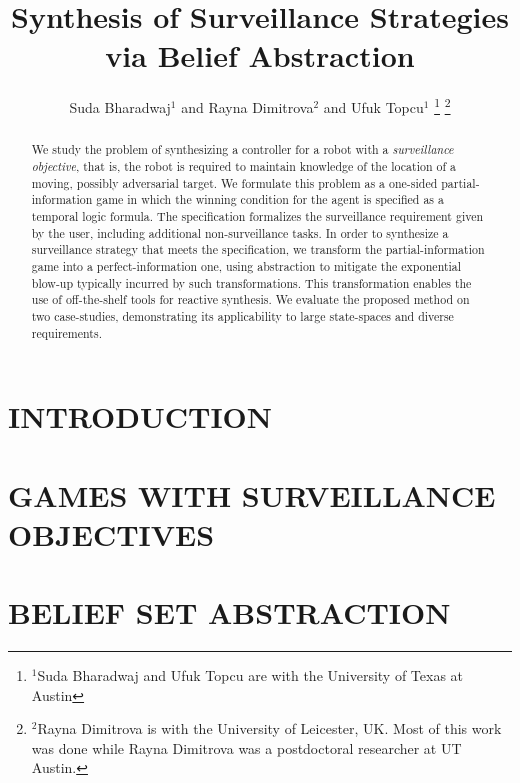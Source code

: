 \documentclass[letterpaper, 10 pt, conference]{ieeeconf}  %
\title{\LARGE \bf Synthesis of Surveillance Strategies via Belief Abstraction}
\author{Suda Bharadwaj$^{1}$ and Rayna Dimitrova$^{2}$ and Ufuk Topcu$^{1}$%
\thanks{$^{1}$Suda Bharadwaj and Ufuk Topcu are with the University of Texas at Austin}%
\thanks{$^{2}$Rayna Dimitrova is with the University of Leicester, UK. Most of this work was done while Rayna Dimitrova was a postdoctoral researcher at UT Austin.}%
}
\begin{document}
\maketitle
\thispagestyle{empty}
\pagestyle{empty}


\begin{abstract}

We study the problem of synthesizing a controller for a robot with a \emph{surveillance objective}, that is, the robot is required to  maintain knowledge of the location of a moving, possibly adversarial target. We formulate this problem as a one-sided partial-information  game in which the winning condition for the agent is specified as a temporal logic formula. The specification formalizes the surveillance requirement given by the user, including additional non-surveillance tasks. In order to synthesize a surveillance strategy that meets the specification, we transform the partial-information game into a perfect-information one, using abstraction to mitigate the exponential blow-up typically incurred by such transformations. This transformation enables the use of off-the-shelf tools for reactive synthesis. We evaluate the proposed method on two case-studies, demonstrating its applicability to large state-spaces and diverse requirements.
\end{abstract}


\section{INTRODUCTION}




\section{GAMES WITH SURVEILLANCE OBJECTIVES}



\section{BELIEF SET ABSTRACTION}

\end{document}
